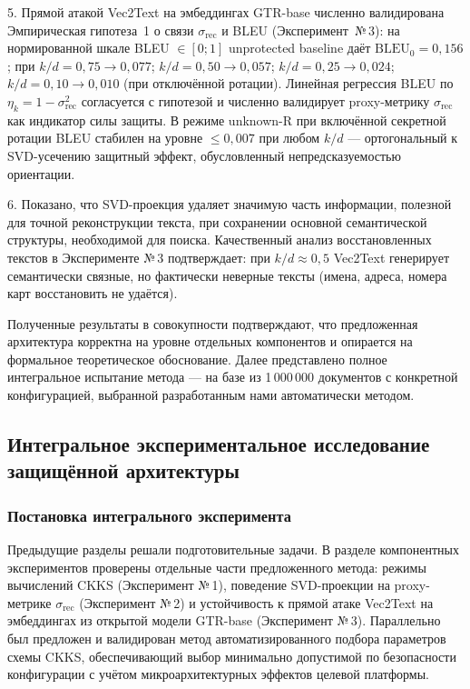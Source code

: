 \documentclass[a4paper, 12pt, oneside, openany]{article}
\begin{document}
5. Прямой атакой Vec2Text на эмбеддингах GTR-base численно валидирована Эмпирическая гипотеза~1 о связи $\sigma_{\mathrm{rec}}$ и BLEU (Эксперимент~№\,3): на нормированной шкале BLEU $\in [0; 1]$ unprotected baseline даёт $\mathrm{BLEU}_{0} = 0{,}156$; при $k/d = 0{,}75 \to 0{,}077$; $k/d = 0{,}50 \to 0{,}057$; $k/d = 0{,}25 \to 0{,}024$; $k/d = 0{,}10 \to 0{,}010$ (при отключённой ротации). Линейная регрессия BLEU по $\eta_k = 1 - \sigma_{\mathrm{rec}}^{2}$ согласуется с гипотезой и численно валидирует proxy-метрику $\sigma_{\mathrm{rec}}$ как индикатор силы защиты. В режиме unknown-R при включённой секретной ротации BLEU стабилен на уровне $\leq 0{,}007$ при любом $k/d$ --- ортогональный к SVD-усечению защитный эффект, обусловленный непредсказуемостью ориентации.

6. Показано, что SVD-проекция удаляет значимую часть информации, полезной для точной реконструкции текста, при сохранении основной семантической структуры, необходимой для поиска. Качественный анализ восстановленных текстов в Эксперименте №\,3 подтверждает: при $k/d \approx 0{,}5$ Vec2Text генерирует семантически связные, но фактически неверные тексты (имена, адреса, номера карт восстановить не удаётся).

Полученные результаты в совокупности подтверждают, что предложенная архитектура корректна на уровне отдельных компонентов и опирается на формальное теоретическое обоснование. Далее представлено полное интегральное испытание метода --- на базе из 1\,000\,000 документов с конкретной конфигурацией, выбранной разработанным нами автоматически методом.

\subsection{Интегральное экспериментальное исследование защищённой архитектуры}

\subsubsection{Постановка интегрального эксперимента}

Предыдущие разделы решали подготовительные задачи. В разделе компонентных экспериментов проверены отдельные части предложенного метода: режимы вычислений CKKS (Эксперимент №\,1), поведение SVD-проекции на proxy-метрике $\sigma_{\mathrm{rec}}$ (Эксперимент №\,2) и устойчивость к прямой атаке Vec2Text на эмбеддингах из открытой модели GTR-base (Эксперимент №\,3). Параллельно был предложен и валидирован метод автоматизированного подбора параметров схемы CKKS, обеспечивающий выбор минимально допустимой по безопасности конфигурации с учётом микроархитектурных эффектов целевой платформы.
\end{document}
